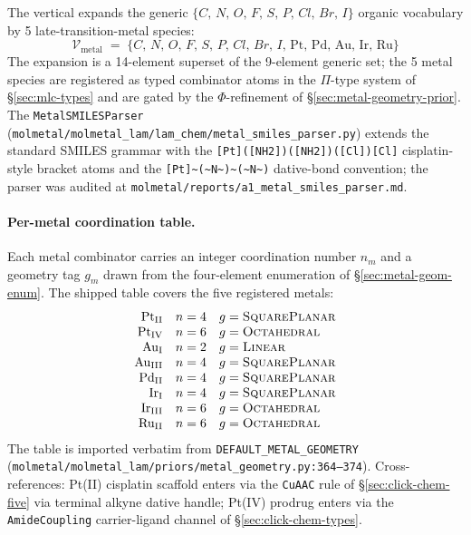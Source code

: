 The vertical expands the generic
$\{C,\,N,\,O,\,F,\,S,\,P,\,Cl,\,Br,\,I\}$ organic vocabulary
by 5 late-transition-metal species:
\begin{equation}
  \label{eq:metallodrug-vocab}
  \mathcal{V}_{\text{metal}} \;=\;
  \{C,\,N,\,O,\,F,\,S,\,P,\,Cl,\,Br,\,I,\,
   \mathrm{Pt},\,\mathrm{Pd},\,\mathrm{Au},\,\mathrm{Ir},\,\mathrm{Ru}\}
\end{equation}
The expansion is a 14-element superset of the 9-element
generic set; the 5 metal species are registered as typed
combinator atoms in the $\Pi$-type system of
\S\ref{sec:mlc-types} and are gated by the
$\Phi$-refinement of \S\ref{sec:metal-geometry-prior}. The
\texttt{MetalSMILESParser}
(\texttt{molmetal/molmetal\_lam/lam\_chem/metal\_smiles\_parser.py})
extends the standard SMILES grammar with the
\texttt{[Pt]([NH2])([NH2])([Cl])[Cl]} cisplatin-style bracket
atoms and the
\texttt{[Pt]\textasciitilde(\textasciitilde N\textasciitilde)\textasciitilde(\textasciitilde N\textasciitilde)}
dative-bond convention; the parser was audited at
\texttt{molmetal/reports/a1\_metal\_smiles\_parser.md}.

\paragraph{Per-metal coordination table.}
Each metal combinator carries an integer coordination number
$n_m$ and a geometry tag $g_m$ drawn from the four-element
enumeration of \S\ref{sec:metal-geom-enum}. The shipped
table covers the five registered metals:
\begin{equation}
  \label{eq:metallodrug-coord-table}
  \begin{array}{rll}
    \mathrm{Pt}_\mathrm{II} & n=4 & g=\textsc{SquarePlanar} \\
    \mathrm{Pt}_\mathrm{IV} & n=6 & g=\textsc{Octahedral} \\
    \mathrm{Au}_\mathrm{I}  & n=2 & g=\textsc{Linear} \\
    \mathrm{Au}_\mathrm{III}& n=4 & g=\textsc{SquarePlanar} \\
    \mathrm{Pd}_\mathrm{II} & n=4 & g=\textsc{SquarePlanar} \\
    \mathrm{Ir}_\mathrm{I}  & n=4 & g=\textsc{SquarePlanar} \\
    \mathrm{Ir}_\mathrm{III}& n=6 & g=\textsc{Octahedral} \\
    \mathrm{Ru}_\mathrm{II} & n=6 & g=\textsc{Octahedral} \\
  \end{array}
\end{equation}
The table is imported verbatim from
\texttt{DEFAULT\_METAL\_GEOMETRY}
(\texttt{molmetal/molmetal\_lam/priors/metal\_geometry.py:364--374}).
Cross-references: Pt(II) cisplatin scaffold enters via the
\texttt{CuAAC} rule of \S\ref{sec:click-chem-five} via
terminal alkyne dative handle; Pt(IV) prodrug enters via
the \texttt{AmideCoupling} carrier-ligand channel of
\S\ref{sec:click-chem-types}.

